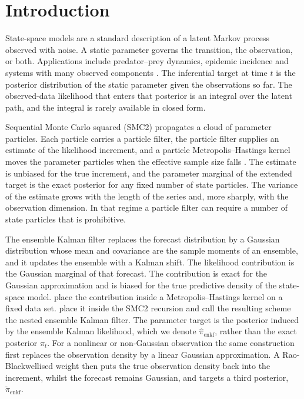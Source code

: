 \section{Introduction}

State-space models are a standard description of a latent Markov process observed with noise. A static parameter governs the transition, the observation, or both. Applications include predator--prey dynamics, epidemic incidence and systems with many observed components \citep{golightly2026,temfack2026}. The inferential target at time \(t\) is the posterior distribution of the static parameter given the observations so far. The observed-data likelihood that enters that posterior is an integral over the latent path, and the integral is rarely available in closed form.

Sequential Monte Carlo squared (SMC2) propagates a cloud of parameter particles. Each particle carries a particle filter, the particle filter supplies an estimate of the likelihood increment, and a particle Metropolis--Hastings kernel moves the parameter particles when the effective sample size falls \citep{chopin2012}. The estimate is unbiased for the true increment, and the parameter marginal of the extended target is the exact posterior for any fixed number of state particles. The variance of the estimate grows with the length of the series and, more sharply, with the observation dimension. In that regime a particle filter can require a number of state particles that is prohibitive.

The ensemble Kalman filter replaces the forecast distribution by a Gaussian distribution whose mean and covariance are the sample moments of an ensemble, and it updates the ensemble with a Kalman shift. The likelihood contribution is the Gaussian marginal of that forecast. The contribution is exact for the Gaussian approximation and is biased for the true predictive density of the state-space model. \citet{drovandi2022} place the contribution inside a Metropolis--Hastings kernel on a fixed data set. \citet{golightly2026} place it inside the SMC2 recursion and call the resulting scheme the nested ensemble Kalman filter. The parameter target is the posterior induced by the ensemble Kalman likelihood, which we denote \(\hat{\pi}_{\mathrm{enkf}}\), rather than the exact posterior \(\pi_t\). For a nonlinear or non-Gaussian observation the same construction first replaces the observation density by a linear Gaussian approximation. A Rao-Blackwellised weight then puts the true observation density back into the increment, whilst the forecast remains Gaussian, and targets a third posterior, \(\tilde{\pi}_{\mathrm{enkf}}\).

